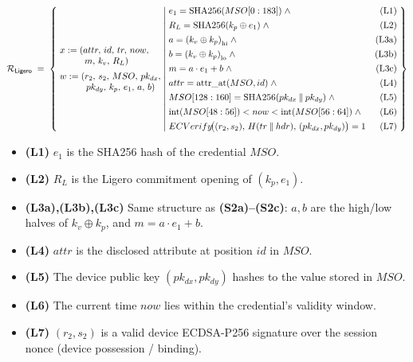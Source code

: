 \documentclass{article}
\newcommand{\concat}{\mathbin{\|}}
\newcommand{\hipart}[1]{{#1}_{\mathrm{hi}}}
\newcommand{\lopart}[1]{{#1}_{\mathrm{lo}}}
\newcommand{\intcast}{\mathrm{int}}
\newcommand{\SHA}{\mathrm{SHA256}}
\newcommand{\attrat}{\mathrm{attr\_at}}
\newcommand{\Rel}[1]{\mathcal{R}_{#1}}
\newcommand{\RelLigero}{\Rel{\mathsf{Ligero}}}
\begin{document}
\begin{mdframed}[style=relationbox]
{\small
\[
\RelLigero \;=\; \left\{\;
\begin{array}{@{}l@{}}
x := (attr,\, id,\, tr,\, now, \\
\phantom{x := (}\, m,\, k_v,\, R_L) \\[5pt]
w := (r_2,\, s_2,\, MSO,\, pk_{dx}, \\
\phantom{w := (}\, pk_{dy},\, k_p,\, e_1,\, a,\, b)
\end{array}
\;\middle|\;
\begin{array}{@{}l@{\quad}r@{}}
e_1 = \SHA(MSO[0:183]) \;\wedge & \text{(L1)} \\[4pt]
R_L = \SHA(k_p \oplus e_1) \;\wedge & \text{(L2)} \\[4pt]
a = \hipart{(k_v \oplus k_p)} \;\wedge & \text{(L3a)} \\[4pt]
b = \lopart{(k_v \oplus k_p)} \;\wedge & \text{(L3b)} \\[4pt]
m = a \cdot e_1 + b \;\wedge & \text{(L3c)} \\[4pt]
attr = \attrat(MSO, id) \;\wedge & \text{(L4)} \\[4pt]
MSO[128:160] = \SHA(pk_{dx} \concat pk_{dy}) \;\wedge & \text{(L5)} \\[4pt]
\intcast(MSO[48:56]) < now < \intcast(MSO[56:64]) \;\wedge & \text{(L6)} \\[4pt]
ECVerify\!\bigl((r_2,s_2),\, H(tr \concat hdr),\, (pk_{dx},pk_{dy})\bigr) = 1 & \text{(L7)}
\end{array}
\;\right\}
\]
}
\end{mdframed}

\begin{itemize}[leftmargin=2em, itemsep=2pt]
  \item \textbf{(L1)} $e_1$ is the SHA256 hash of the credential $MSO$.
  \item \textbf{(L2)} $R_L$ is the Ligero commitment opening of $(k_p, e_1)$.
  \item \textbf{(L3a),(L3b),(L3c)} Same structure as \textbf{(S2a)--(S2c)}:
        $a, b$ are the high/low halves of $k_v \oplus k_p$, and
        $m = a \cdot e_1 + b$.
  \item \textbf{(L4)} $attr$ is the disclosed attribute at position $id$ in $MSO$.
  \item \textbf{(L5)} The device public key $(pk_{dx}, pk_{dy})$ hashes to the
        value stored in $MSO$.
  \item \textbf{(L6)} The current time $now$ lies within the credential's
        validity window.
  \item \textbf{(L7)} $(r_2, s_2)$ is a valid device ECDSA-P256 signature
        over the session nonce (device possession / binding).
\end{itemize}
\end{document}
